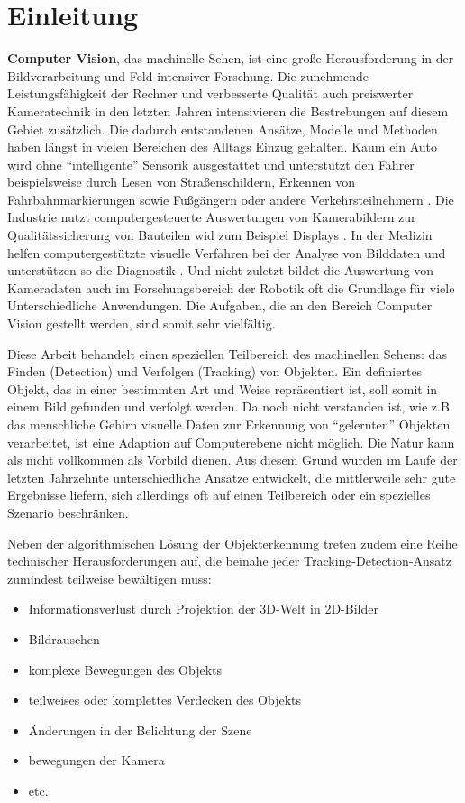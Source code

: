 \section{Einleitung}
\textbf{Computer Vision}, das machinelle Sehen, ist eine große Herausforderung in der Bildverarbeitung und Feld intensiver Forschung. Die zunehmende Leistungsfähigkeit der Rechner und verbesserte Qualität auch preiswerter Kameratechnik in den letzten Jahren intensivieren die Bestrebungen auf diesem Gebiet zusätzlich. Die dadurch entstandenen Ansätze, Modelle und Methoden haben längst in vielen Bereichen des Alltags Einzug gehalten. Kaum ein Auto wird ohne ``intelligente'' Sensorik ausgestattet und unterstützt den Fahrer beispielsweise durch Lesen von Straßenschildern, Erkennen von Fahrbahnmarkierungen sowie Fußgängern oder andere Verkehrsteilnehmern \cite{PED}. Die Industrie nutzt computergesteuerte Auswertungen von Kamerabildern zur Qualitätssicherung von Bauteilen wid zum Beispiel Displays \cite{LCD}. In der Medizin helfen computergestützte visuelle Verfahren bei der Analyse von Bilddaten und unterstützen so die Diagnostik \cite{MIP}. Und nicht zuletzt bildet die Auswertung von Kameradaten auch im Forschungsbereich der Robotik oft die Grundlage für viele Unterschiedliche Anwendungen. Die Aufgaben, die an den Bereich Computer Vision gestellt werden, sind somit sehr vielfältig.

Diese Arbeit behandelt einen speziellen Teilbereich des machinellen Sehens: das Finden (Detection) und Verfolgen (Tracking) von Objekten. Ein definiertes Objekt, das in einer bestimmten Art und Weise repräsentiert ist, soll somit in einem Bild gefunden und verfolgt werden. Da noch nicht verstanden ist, wie z.B. das menschliche Gehirn visuelle Daten zur Erkennung von ``gelernten'' Objekten verarbeitet, ist eine Adaption auf Computerebene nicht möglich. Die Natur kann als nicht vollkommen als Vorbild dienen. Aus diesem Grund wurden im Laufe der letzten Jahrzehnte unterschiedliche Ansätze entwickelt, die mittlerweile sehr gute Ergebnisse liefern, sich allerdings oft auf einen Teilbereich oder ein spezielles Szenario beschränken.

Neben der algorithmischen Lösung der Objekterkennung treten zudem eine Reihe technischer Herausforderungen auf, die beinahe jeder Tracking-Detection-Ansatz zumindest teilweise bewältigen muss: 

\begin{itemize}
\item Informationsverlust durch Projektion der 3D-Welt in 2D-Bilder
\item Bildrauschen
\item komplexe Bewegungen des Objekts
\item teilweises oder komplettes Verdecken des Objekts
\item Änderungen in der Belichtung der Szene
\item bewegungen der Kamera
\item etc.
\end{itemize}

